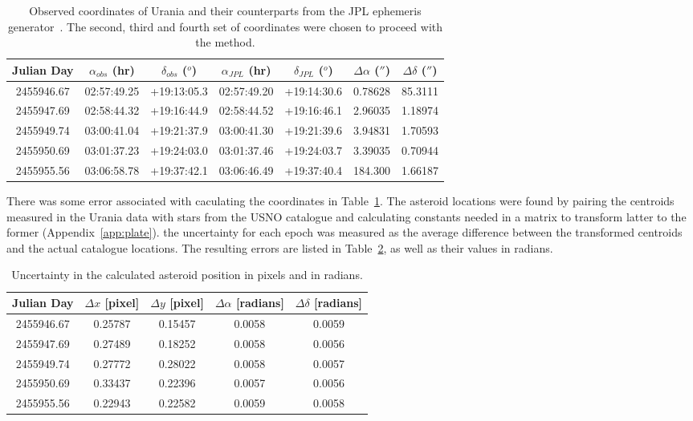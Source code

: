 \documentclass[a4paper,12pt]{article}
\begin{document}
\begin{table}[!htbp]
  \centering
  \begin{tabular}{|c||c||c||c||c||c||c|}
  \hline
   Julian Day & $\alpha_{obs}$ (hr) & $\delta_{obs}$ ($^o$) & $\alpha_{JPL}$ (hr) & $\delta_{JPL}$ ($^o$) & $\Delta\alpha$ ($''$) & $\Delta\delta$ ($''$)\\
   \hline
   \hline
   2455946.67 & 02:57:49.25 & +19:13:05.3 & 02:57:49.20 & +19:14:30.6 & 0.78628 & 85.3111\\
   \hline
   2455947.69 & 02:58:44.32 & +19:16:44.9 & 02:58:44.52 & +19:16:46.1 & 2.96035 & 1.18974\\
   \hline
   2455949.74 & 03:00:41.04 & +19:21:37.9 & 03:00:41.30 & +19:21:39.6 & 3.94831 & 1.70593\\
   \hline
   2455950.69 & 03:01:37.23 & +19:24:03.0 & 03:01:37.46 & +19:24:03.7 & 3.39035 & 0.70944\\
   \hline
   2455955.56 & 03:06:58.78 & +19:37:42.1 & 03:06:46.49 & +19:37:40.4 & 184.300 & 1.66187\\
   \hline
   \end{tabular}
    \caption{Observed coordinates of Urania and their counterparts from the JPL ephemeris generator~\citep{urania}. The second, third and fourth set of coordinates were chosen to proceed with the method.}
    \label{tab:coords}
\end{table}

There was some error associated with caculating the coordinates in Table~\ref{tab:coords}. The asteroid locations were found by pairing the centroids measured in the Urania data with stars from the USNO catalogue and calculating constants needed in a matrix to transform latter to the former (Appendix~\ref{app:plate}). the uncertainty for each epoch was measured as the average difference between the transformed centroids and the actual catalogue locations. The resulting errors are listed in Table~\ref{tab:pixresid}, as well as their values in radians.

\begin{table}[!htbp]
  \centering
  \begin{tabular}{|c||c||c||c||c|}
  \hline
   Julian Day & $\Delta x$ [pixel] & $\Delta y$ [pixel] & $\Delta\alpha$ [radians] & $\Delta\delta$ [radians]\\
   \hline
   \hline
   2455946.67 & 0.25787 & 0.15457 & 0.0058 & 0.0059\\
   \hline
   2455947.69 & 0.27489 & 0.18252 & 0.0058 & 0.0056\\
   \hline
   2455949.74 & 0.27772 & 0.28022 & 0.0058 & 0.0057\\
   \hline
   2455950.69 & 0.33437 & 0.22396 & 0.0057 & 0.0056\\
   \hline
   2455955.56 & 0.22943 & 0.22582 & 0.0059 & 0.0058\\
   \hline
   \end{tabular}
    \caption{Uncertainty in the calculated asteroid position in pixels and in radians.}
    \label{tab:pixresid}
\end{table}
\end{document}
